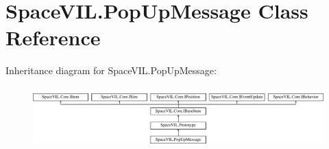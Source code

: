 \hypertarget{class_space_v_i_l_1_1_pop_up_message}{}\section{Space\+V\+I\+L.\+Pop\+Up\+Message Class Reference}
\label{class_space_v_i_l_1_1_pop_up_message}
Inheritance diagram for Space\+V\+I\+L.\+Pop\+Up\+Message\+:\begin{figure}[H]
\begin{center}
\leavevmode
\includegraphics[height=2.421622cm]{class_space_v_i_l_1_1_pop_up_message}
\end{center}
\end{figure}
